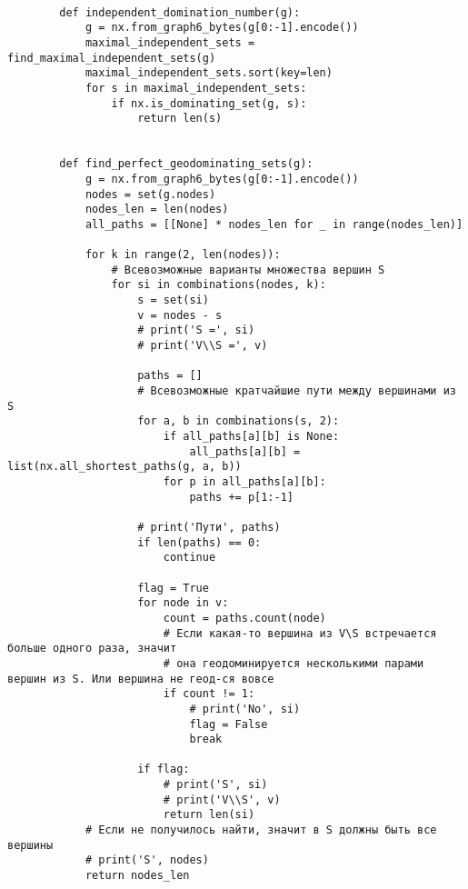 \documentclass[bachelor, och, nir]{SCWorks}
\begin{document}
\begin{verbatim}
        
        def independent_domination_number(g):
            g = nx.from_graph6_bytes(g[0:-1].encode())
            maximal_independent_sets = find_maximal_independent_sets(g)
            maximal_independent_sets.sort(key=len)
            for s in maximal_independent_sets:
                if nx.is_dominating_set(g, s):
                    return len(s)
        
        
        def find_perfect_geodominating_sets(g):
            g = nx.from_graph6_bytes(g[0:-1].encode())
            nodes = set(g.nodes)
            nodes_len = len(nodes)
            all_paths = [[None] * nodes_len for _ in range(nodes_len)]
        
            for k in range(2, len(nodes)):
                # Всевозможные варианты множества вершин S
                for si in combinations(nodes, k):
                    s = set(si)
                    v = nodes - s
                    # print('S =', si)
                    # print('V\\S =', v)
        
                    paths = []
                    # Всевозможные кратчайшие пути между вершинами из S
                    for a, b in combinations(s, 2):
                        if all_paths[a][b] is None:
                            all_paths[a][b] = list(nx.all_shortest_paths(g, a, b))
                        for p in all_paths[a][b]:
                            paths += p[1:-1]
        
                    # print('Пути', paths)
                    if len(paths) == 0:
                        continue
        
                    flag = True
                    for node in v:
                        count = paths.count(node)
                        # Если какая-то вершина из V\S встречается больше одного раза, значит
                        # она геодоминируется несколькими парами вершин из S. Или вершина не геод-ся вовсе
                        if count != 1:
                            # print('No', si)
                            flag = False
                            break
        
                    if flag:
                        # print('S', si)
                        # print('V\\S', v)
                        return len(si)
            # Если не получилось найти, значит в S должны быть все вершины
            # print('S', nodes)
            return nodes_len
        

\end{verbatim}
\end{document}

